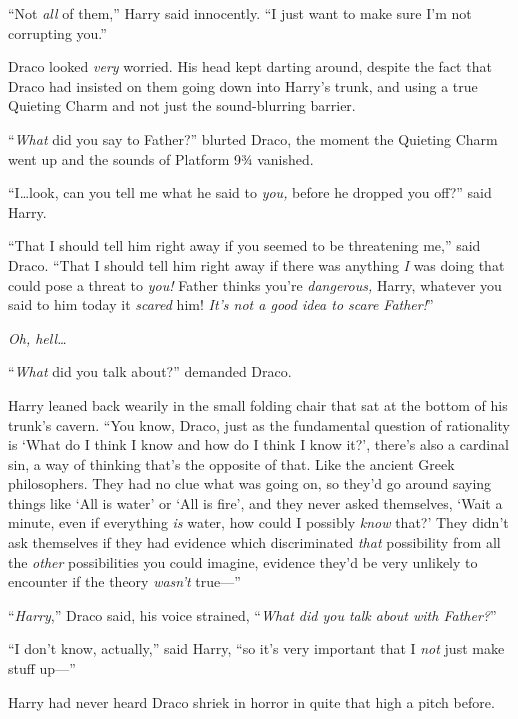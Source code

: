 “Not \emph{all} of them,” Harry said innocently. “I just want to make sure I’m not corrupting you.”

\later

Draco looked \emph{very} worried. His head kept darting around, despite the fact that Draco had insisted on them going down into Harry’s trunk, and using a true Quieting Charm and not just the sound-blurring barrier.

“\emph{What} did you say to Father?” blurted Draco, the moment the Quieting Charm went up and the sounds of Platform 9¾ vanished.

“I…look, can you tell me what he said to \emph{you,} before he dropped you off?” said Harry.

“That I should tell him right away if you seemed to be threatening me,” said Draco. “That I should tell him right away if there was anything \emph{I} was doing that could pose a threat to \emph{you!} Father thinks you’re \emph{dangerous,} Harry, whatever you said to him today it \emph{scared} him! \emph{It’s not a good idea to scare Father!}”

\emph{Oh, hell…}

“\emph{What} did you talk about?” demanded Draco.

Harry leaned back wearily in the small folding chair that sat at the bottom of his trunk’s cavern. “You know, Draco, just as the fundamental question of rationality is ‘What do I think I know and how do I think I know it?’, there’s also a cardinal sin, a way of thinking that’s the opposite of that. Like the ancient Greek philosophers. They had no clue what was going on, so they’d go around saying things like ‘All is water’ or ‘All is fire’, and they never asked themselves, ‘Wait a minute, even if everything \emph{is} water, how could I possibly \emph{know} that?’ They didn’t ask themselves if they had evidence which discriminated \emph{that} possibility from all the \emph{other} possibilities you could imagine, evidence they’d be very unlikely to encounter if the theory \emph{wasn’t} true—”

“\emph{Harry},” Draco said, his voice strained, “\emph{What did you talk about with Father?}”

“I don’t know, actually,” said Harry, “so it’s very important that I \emph{not} just make stuff up—”

Harry had never heard Draco shriek in horror in quite that high a pitch before.

